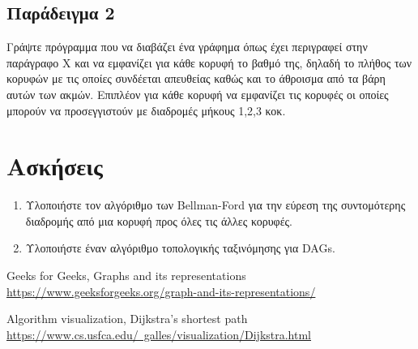 \subsection{Παράδειγμα 2}
Γράψτε πρόγραμμα που να διαβάζει ένα γράφημα όπως έχει περιγραφεί στην παράγραφο Χ και να εμφανίζει για κάθε κορυφή το βαθμό της, δηλαδή το πλήθος των κορυφών με τις οποίες συνδέεται απευθείας καθώς και το άθροισμα από τα βάρη αυτών των ακμών. Επιπλέον για κάθε κορυφή να εμφανίζει τις κορυφές οι οποίες μπορούν να προσεγγιστούν με διαδρομές μήκους 1,2,3 κοκ.


\section{Ασκήσεις}
\begin{enumerate}
	\item Υλοποιήστε τον αλγόριθμο των Bellman-Ford για την εύρεση της συντομότερης διαδρομής από μια κορυφή προς όλες τις άλλες κορυφές.
	\item Υλοποιήστε έναν αλγόριθμο τοπολογικής ταξινόμησης για DAGs.
\end{enumerate}

\begin{thebibliography}{9}
Geeks for Geeks, Graphs and its representations \href{https://www.geeksforgeeks.org/graph-and-its-representations/}{https://www.geeksforgeeks.org/graph-and-its-representations/}

Algorithm visualization, Dijkstra's shortest path \href{https://www.cs.usfca.edu/~galles/visualization/Dijkstra.html}{https://www.cs.usfca.edu/~galles/visualization/Dijkstra.html}

\end{thebibliography}
